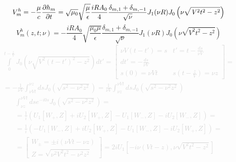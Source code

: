 %
\textcolor{lightgray} { \begin{equation*} \begin{aligned}
V_m^h = - \frac{\mu}{c} \frac{\partial h_m}{\partial t} = 
\sqrt{\mu_0} \sqrt{\frac{\mu}{\epsilon}} \frac{iR A_0}{4} 
\frac{\delta_{m,1} + \delta_{m,-1}}{\sqrt{\nu}} J_1 (\nu R)
J_0 \left( \nu \sqrt{\mathit{V}^2 t^2 - z^2} \right)
\end{aligned} \end{equation*} }
%
\begin{equation}
V_m^h (z, t; \nu) = - \frac{iR A_0}{4} \sqrt{\frac{\mu_0 \mu}{\epsilon}} 
\frac{\delta_{m,1} + \delta_{m,-1}}{\sqrt{\nu}} J_1 (\nu R)
J_0 \left( \nu \sqrt{\mathit{V}^2 t^2 - z^2} \right)
\end{equation}
%
\textcolor{lightgray} { \begin{equation*} \begin{aligned}
\int \limits_{0}^{t - \frac{z}{\mathit{V}}} 
J_0 \left( \nu \sqrt{\mathit{V}^2 (t-t')^2 - z^2} 
\right) dt' = \left[ \begin{array}{cc} 
\nu \mathit{V} (t-t') = s & t' = t - \frac{ds}{\nu \mathit{V}} \\
dt' = -\frac{ds}{\nu \mathit{V}} & \\
s(0) = \nu \mathit{V} t & s \left( t - \frac{z}{\mathit{V}} \right) = \nu z
\end{array} \right] = \\ = - \frac{1}{\nu \mathit{V}} 
\int_{\nu \mathit{V} t}^{\nu z} ds 
J_0 (\sqrt{s^2 - \nu^2 z^2}) = \frac{1}{\nu \mathit{V}} 
\int_{\nu z}^{\nu \mathit{V} t} ds
J_0 (\sqrt{s^2 - \nu^2 z^2})
\end{aligned} \end{equation*} }
%
\textcolor{lightgray} { \begin{equation*} \begin{aligned}
\int_{\nu z}^{\nu \mathit{V} t} ds e^{-i0s} J_0 (\sqrt{s^2 - \nu^2 z^2}) = \\ 
= \frac{1}{i} (U_1[W_+,Z] + i U_2[W_+,Z] - U_1[W_-,Z] - i U_2[W_-,Z]) = \\
= \frac{1}{i} (-U_1[W_-,Z] + i U_2[W_+,Z] - U_1[W_-,Z] - i U_2[W_+,Z]) = \\
= \left[ \begin{array}{c} W_\pm = \pm i (\nu \mathit{V} t - \nu z) \\
Z = \sqrt{\nu^2 \mathit{V}^2 t^2 - \nu^2 z^2} \end{array} \right] = 
2i U_1 \left[ -i \nu (\mathit{V}t-z), \nu \sqrt{\mathit{V}^2 t^2-z^2} \right]
\end{aligned} \end{equation*} }
